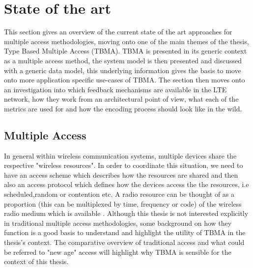 \documentclass{article}
\begin{document}
\section{State of the art} \label{sota}
This section gives an overview of the current state of the art approaches for multiple access methodologies, moving onto one of the main themes of the thesis, Type Based Multiple Access (TBMA). TBMA is presented in its generic context as a multiple access method, the system model is then presented and discussed with a generic data model, this underlying information gives the basis to move onto more application specific use-cases of TBMA. 
The section then moves onto an investigation into which feedback mechanisms are available in the LTE network, how they work from an architectural point of view, what each of the metrics are used for and how the encoding process should look like in the wild.

\subsection{Multiple Access}

In general within wireless communication systems, multiple devices share the respective "wireless resources". In order to coordinate this situation, we need to have an access scheme which describes how the resources are shared and then also an access protocol which defines how the devices access the the resources, i.e scheduled,random or contention etc. A radio resource can be thought of as a proportion (this can be multiplexed by time, frequency or code) of the wireless radio medium which is available \cite{access_tech}. Although this thesis is not interested explicitly in traditional multiple access methodologies, some background on how they function is a good basis to understand and highlight the utility of TBMA in the thesis's context. The comparative overview of traditional access and what could be referred to "new age" access will highlight why TBMA is sensible for the context of this thesis. 
\end{document}
